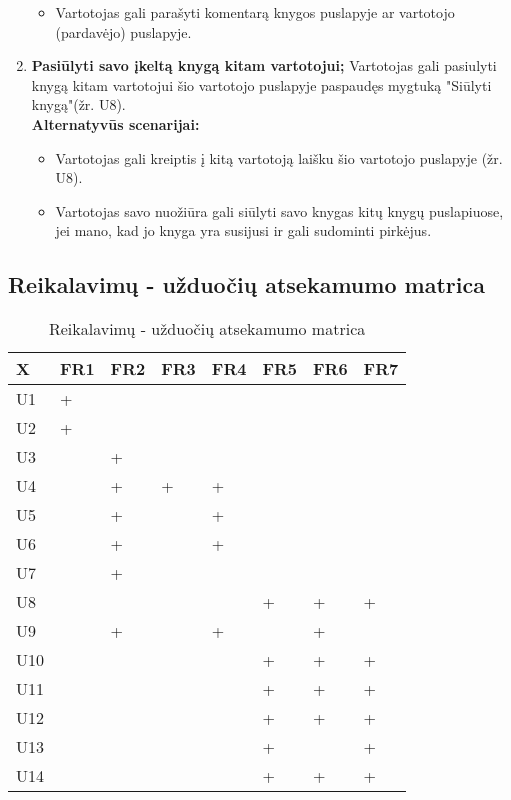 \documentclass{VUMIFPSkursinis}
\begin{document}
\begin{enumerate}[label=\textbf{U\arabic*.}]
				\begin{itemize}
					\item Vartotojas gali parašyti komentarą knygos puslapyje ar vartotojo (pardavėjo) puslapyje.
				\end{itemize}
			\item \textbf{Pasiūlyti savo įkeltą knygą kitam vartotojui;}
				Vartotojas gali pasiulyti knygą kitam vartotojui šio vartotojo puslapyje paspaudęs mygtuką "Siūlyti knygą"(žr. U8).\\
				\textbf{Alternatyvūs scenarijai:}
				\begin{itemize}
					\item Vartotojas gali kreiptis į kitą vartotoją laišku šio vartotojo puslapyje (žr. U8).
					\item Vartotojas savo nuožiūra gali siūlyti savo knygas kitų knygų puslapiuose, jei mano, kad jo knyga yra susijusi ir gali sudominti pirkėjus.
				\end{itemize}
		\end{enumerate}
	\subsection{Reikalavimų - užduočių atsekamumo matrica}\label{strukturinisDSModelis_matrica}
\begin{table}[H]\footnotesize
  \centering
  \caption{Reikalavimų - užduočių atsekamumo matrica}
  \resizebox{\textwidth}{!}
  {\begin{tabular}{|l| l| l| l| l| l| l| l|} \hline
    	X		& FR1		& FR2		& FR3		& FR4		& FR5		& FR6		& FR7\\
\hline
	U1		&+		&		&		&		&		&		&\\
\hline
	U2		&+		&		&		&		&		&		&\\
\hline
	U3		&		&+		&		&		&		&		&\\
\hline
	U4		&		&+		&+		&+		&		&		&\\
\hline
	U5		&		&+		&		&+		&		&		&\\
\hline
	U6		&		&+		&		&+		&		&		&\\
\hline
	U7		&		&+		&		&		&		&		&\\
\hline
	U8		&		&		&		&		&+		&+		&+\\
\hline
	U9		&		&+		&		&+		&		&+		&\\
\hline
	U10		&		&		&		&		&+		&+		&+\\
\hline
	U11		&		&		&		&		&+		&+		&+\\
\hline
	U12		&		&		&		&		&+		&+		&+\\
\hline
	U13		&		&		&		&		&+		&		&+\\
\hline
	U14		&		&		&		&		&+		&+		&+\\
\hline
  \end{tabular}}
  \label{tab:table example}
\end{table}
\end{document}

